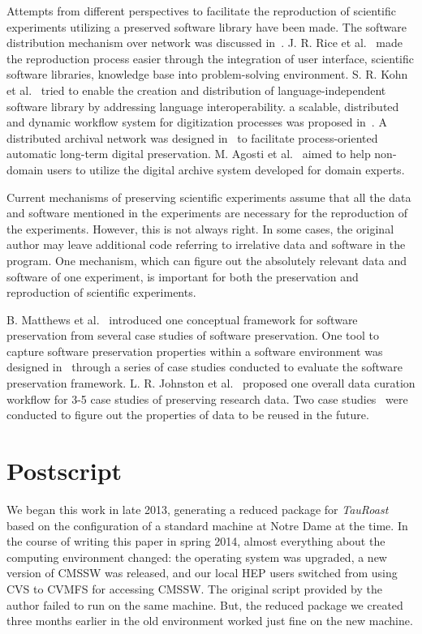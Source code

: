 \documentclass[procedia]{easychair}
\begin{document}
Attempts from different perspectives to facilitate the reproduction of scientific experiments utilizing a preserved software library have been made. 
The software distribution mechanism over network was discussed in~\cite{compostella2010cdf, blomer2011cernvm}.
J. R. Rice et al.~\cite{rice1996scientific} made the reproduction process easier through the integration of user interface, scientific software libraries, knowledge base into problem-solving environment.
S. R. Kohn et al.~\cite{kohn2001divorcing} tried to enable the creation and distribution of language-independent software library by addressing language interoperability.
a scalable, distributed and dynamic workflow system for digitization processes was proposed in~\cite{schoneberg2013scalable}.
A distributed archival network was designed in~\cite{subotic2013distributed} to facilitate process-oriented automatic long-term digital preservation.
M. Agosti et al.~\cite{agosti2012envisage} aimed to help non-domain users to utilize the digital archive system developed for domain experts.

Current mechanisms of preserving scientific experiments assume that all the data and software mentioned in the experiments are necessary for the reproduction of the experiments. However, this is not always right. In some cases, the original author may leave additional code referring to irrelative data and software in the program. One mechanism, which can figure out the absolutely relevant data and software of one experiment, is important for both the preservation and reproduction of scientific experiments.

B. Matthews et al.~\cite{matthews2008significant} introduced one conceptual framework for software preservation from several case studies of software preservation.
One tool to capture software preservation properties within a software environment was designed in~\cite{matthews2010framework} through a series of case studies conducted to evaluate the software preservation framework.
L. R. Johnston et al.~\cite{johnston2014workflow} proposed one overall data curation workflow for 3-5 case studies of preserving research data.
Two case studies~\cite{borgman2012data} were conducted to figure out the properties of data to be reused in the future.

\section{Postscript}

We began this work in late 2013, generating a reduced package for \emph{TauRoast} based
on the configuration of a standard machine at Notre Dame at the time.  In the course
of writing this paper in spring 2014, almost everything about the computing environment
changed: the operating system was upgraded, a new version of CMSSW was released, and
our local HEP users switched from using CVS to CVMFS for accessing CMSSW.
The original script provided by the author failed to run on the same machine.
But, the reduced package we created three months earlier in the old environment
worked just fine on the new machine.
\end{document}
